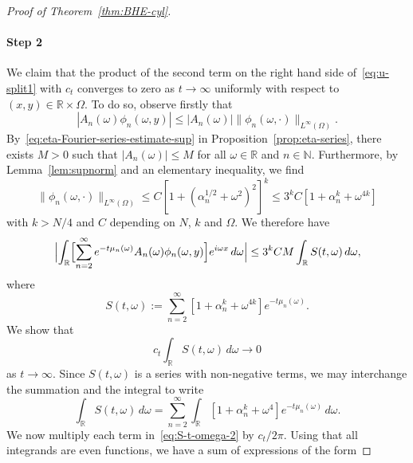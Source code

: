 \documentclass[a4paper, reqno,titlepage]{amsart}
\numberwithin{equation}{section}
\theoremstyle{plain}
\theoremstyle{definition}
\theoremstyle{remark}
\newcommand{\NN}{\mathbb{N}}
\newcommand{\RR}{\mathbb{R}}
\begin{document}
\begin{proof}[Proof of Theorem~\ref{thm:BHE-cyl}]
  \paragraph{Step 2}
  We claim that the product of the second term on the right hand side of~\eqref{eq:u-split1} with $c_t$ converges to zero as $t \to \infty$ uniformly with respect to $(x,y) \in \RR \times   \Omega$. To do so, observe firstly that
  \begin{equation*}
    \left|A_n(\omega) \phi_n(\omega, y)\right| \leq |A_n(\omega)| \|\phi_n(\omega,\cdot)\|_{L^\infty(\Omega)}.
  \end{equation*}
  By~\eqref{eq:eta-Fourier-series-estimate-sup} in Proposition~\ref{prop:eta-series}, there exists $M>0$ such that $|A_n(\omega)|\leq M$ for all $\omega\in\RR$ and $n \in \NN$. Furthermore, by Lemma~\ref{lem:supnorm} and an elementary inequality, we find
  \begin{equation}
    \label{eq:phi-n-expand}
    \|\phi_n(\omega, \cdot) \|_{L^\infty(\Omega)}
    \leq C \left[ 1+(\alpha_n^{1/2} +\omega^2)^2 \right]^k
    \leq 3^{k}C\left[ 1+\alpha_n^{k} +\omega^{4k} \right]
  \end{equation}
  with $k>N/4$ and $C$ depending on $N$, $k$ and $\Omega$. We therefore have
  \begin{equation*}
    \Bigl|\int_{\RR} \Bigl[ \sum_{n=2}^\infty e^{-t \mu_n(\omega)} A_n(\omega) \phi_n(\omega, y) \Bigr] e^{i \omega x} \,d\omega\Bigr|
    \leq 3^{k}CM\int_{\RR}S(t, \omega) \,d\omega,
  \end{equation*}
  where
  \begin{equation*}
    S(t, \omega) := \sum_{n = 2}^\infty \left[ 1+\alpha_n^k +\omega^{4k} \right]e^{ -t\mu_n(\omega) }.
  \end{equation*}
  We show that
  \begin{equation}
    \label{eq:S-t-omega}
    c_t \int_\RR S(t, \omega) \,d\omega \longrightarrow 0
  \end{equation}
  as $t \to \infty$. Since $S(t, \omega)$ is a series with non-negative terms, we may interchange the summation and the integral to write
  \begin{equation}
    \label{eq:S-t-omega-2}
    \int_\RR S(t, \omega) \,d\omega
    = \sum_{n = 2}^\infty\int_\RR \left[1+\alpha_n^k+\omega^4\right] e^{-t \mu_n(\omega)} \,d\omega.
  \end{equation}
  We now multiply each term in~\eqref{eq:S-t-omega-2} by $c_t/2\pi$. Using that all integrands are even functions, we have a sum of expressions of the form

\end{proof}
\end{document}

